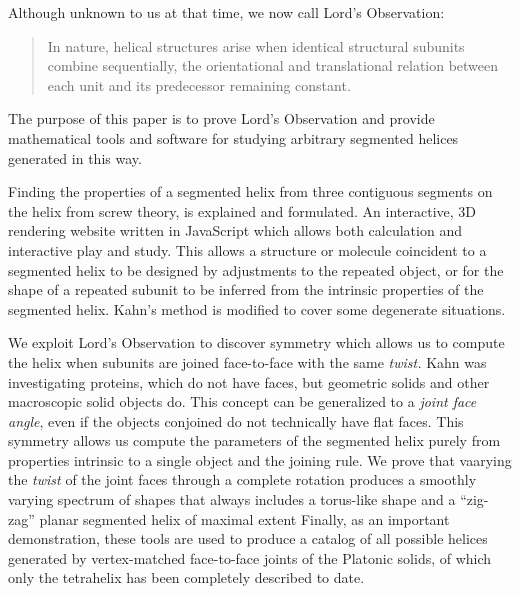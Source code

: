 \documentclass[11pt]{article}
\begin{document}
{Although unknown to us at that time, we now call Lord's Observation:
\begin{quote}
  In nature, helical structures arise when identical structural subunits combine sequentially, the orientational and translational relation between each unit
  and its predecessor remaining constant.\cite{lord2002helical}
\end{quote}
The purpose of this paper is to prove Lord's Observation and provide mathematical tools and software for studying arbitrary
segmented helices generated in this way.

Finding the properties of a segmented helix from three contiguous segments on the helix from screw theory\cite{abbasi2015review,wittenburg2016kinematics,wiki:screwaxis,kahn1989defining},
is explained and formulated. An interactive, 3D rendering website written in JavaScript which allows both calculation and
interactive play and study\cite{segmentedhelixinteractive}. This allows
a structure or molecule coincident to a segmented helix to be designed
by adjustments to the repeated object, or for the shape of
a repeated subunit to be inferred from the intrinsic properties of the
segmented helix.
Kahn's method \cite{kahn1989defining} is modified to cover some degenerate situations.

We exploit Lord's Observation to discover symmetry which allows us to compute the helix when subunits are joined face-to-face with
the same {\em twist.} Kahn was investigating proteins, which do not have faces, but geometric solids and other macroscopic solid objects do.
This concept can be generalized to a {\em joint face angle}, even if the
objects conjoined do not technically have flat faces.
This symmetry allows us compute the parameters of the segmented helix purely from
properties intrinsic to a single object and the joining rule.
We prove that vaarying the {\em twist} of the joint faces through a complete rotation produces a smoothly varying
spectrum of shapes that always includes a torus-like shape and a ``zig-zag'' planar segmented helix of maximal extent
Finally, as an important demonstration, these tools are used to produce
a catalog of all possible helices generated by vertex-matched face-to-face joints of the
Platonic solids, of which only the tetrahelix\cite{coxeter1985simplicial,sadler2013periodic,fuller1982synergetics,read2018transforming,pearce1990structure}
has been completely described to date.

}
\end{document}
